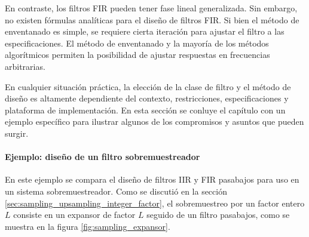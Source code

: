 \documentclass[a4paper]{report}
\begin{document}
En contraste, los filtros FIR pueden tener fase lineal generalizada. Sin embargo, no existen fórmulas analíticas para el diseño de filtros FIR. Si bien el método de enventanado es simple, se requiere cierta iteración para ajustar el filtro a las especificaciones. El método de enventanado y la mayoría de los métodos algorítmicos permiten la posibilidad de ajustar respuestas en frecuencias arbitrarias.

En cualquier situación práctica, la elección de la clase de filtro y el método de diseño es altamente dependiente del contexto, restricciones, especificaciones y plataforma de implementación. En esta sección se conluye el capítulo con un ejemplo específico para ilustrar algunos de los compromisos y asuntos que pueden surgir.

\paragraph{Ejemplo: diseño de un filtro sobremuestreador} En este ejemplo se compara el diseño de filtros IIR y FIR pasabajos para uso en un sistema sobremuestreador. Como se discutió en la sección \ref{sec:sampling_upsampling_integer_factor}, el sobremuestreo por un factor entero \(L\) consiste en un expansor de factor \(L\) seguido de un filtro pasabajos, como se muestra en la figura \ref{fig:sampling_expansor}.
\end{document}
